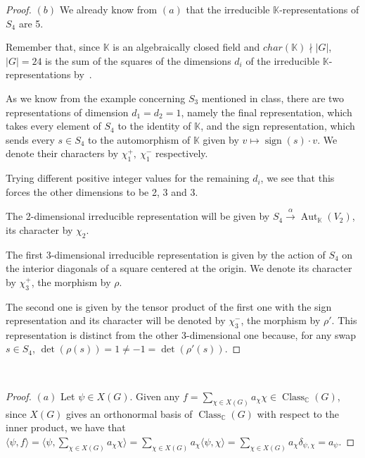 \documentclass{article}
\newcommand{\numberset}{\mathbb}
\newcommand{\C}{\numberset{C}}
\newcommand{\K}{\numberset{K}}
\newcommand{\exercise}[1]{\noindent {\bf Exercise #1}}
\DeclareMathOperator{\Aut}{Aut}
\DeclareMathOperator{\sign}{sign}
\DeclareMathOperator{\Class}{Class}
\begin{document}
\begin{proof}
    $(b)$ We already know from $(a)$ that the irreducible $\K$-representations
    of $S_4$ are 5.

    Remember that, since $\K$ is an algebraically closed field and
    $char(\K)\nmid|G|$, $|G|=24$ is the sum of the squares of the dimensions
    $d_i$ of the irreducible $\K$-representations by~\cite[thm. 9.14]{Tor10}.

    As we know from the example concerning $S_3$ mentioned in class, there are
    two representations of dimension $d_1=d_2=1$, namely the final
    representation, which takes every element of $S_4$ to the identity of $\K$,
    and the sign representation, which sends every $s\in S_4$ to the
    automorphism of $\K$ given by $v\mapsto\sign(s)\cdot v$. We denote their
    characters by $\chi_1^+,\ \chi_1^-$ respectively.
    
    Trying different positive integer values for the remaining $d_i$, we see
    that this forces the other dimensions to be 2, 3 and 3.

    The 2-dimensional irreducible representation will be given by
    $S_4\xrightarrow{\alpha}\Aut_{\K}(V_2)$, its character by $\chi_2$.

    The first 3-dimensional irreducible representation is given by the action of
    $S_4$ on the interior diagonals of a square centered at the origin. We
    denote its character by $\chi_3^+$, the morphism by $\rho$.

    The second one is given by the tensor product of the first one with the sign
    representation and its character will be denoted by $\chi_3^-$, the morphism
    by $\rho'$. This representation is distinct from the other 3-dimensional one
    because, for any swap $s\in S_4$, $\det(\rho(s))=1\neq -1=\det(\rho'(s))$.
\end{proof}


~\\
\exercise{8.2}

\begin{proof}
    $(a)$ Let $\psi\in X(G)$. Given any $f=\sum_{\chi\in
    X(G)}a_\chi\chi\in\Class_{\C}(G)$, since $X(G)$ gives an
    orthonormal basis of $\Class_{\C}(G)$ with respect to the inner product, we
    have that $\langle\psi,f\rangle=\langle\psi,\sum_{\chi\in
    X(G)}a_\chi\chi\rangle=\sum_{\chi\in
    X(G)}a_\chi\langle\psi,\chi\rangle=\sum_{\chi\in
    X(G)}a_\chi\delta_{\psi,\chi}=a_{\psi}$.
\end{proof}
\end{document}
